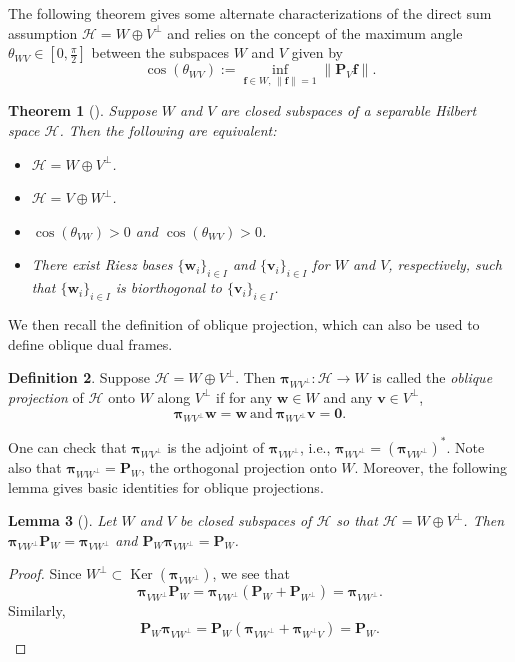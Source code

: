 \documentclass{amsart}
\numberwithin{equation}{section}
\DeclareMathOperator{\kernel}{Ker}
\newcommand{\bP}{{\mathbf P}}
\newcommand{\bpi}{{\boldsymbol{\pi}}}
\theoremstyle{plain}
\newtheorem{theorem}{Theorem}[section]
\newtheorem{lemma}[theorem]{Lemma}
\theoremstyle{remark}
\theoremstyle{definition}
\newtheorem{definition}[theorem]{Definition}
\begin{document}
The following theorem gives some alternate characterizations of the direct sum assumption $\mathcal{H} = W \oplus V^{\perp}$ and
relies on the concept of the maximum angle $\theta_{WV} \in [0, \frac{\pi}{2}]$ between the subspaces $W$ and $V$ given by
\begin{equation*}
    \cos(\theta_{WV}) := \inf_{{\mathbf{f} \in W, \,\|\mathbf{f}\|=1}} \| \bP_V \mathbf{f} \|. 
\end{equation*}
\begin{theorem}[{\cite[Theorem 2.3]{tang2000oblique}}]\label{lem:directsumangle}
Suppose $W$ and $V$ are closed subspaces of a separable Hilbert space $\mathcal{H}$. Then the following are equivalent:
\begin{itemize}
  \item[$(1)$] $\mathcal{H} = W \oplus V^{\perp}$.
    \item[$(2)$] $\mathcal{H} = V \oplus W^{\perp}$.
    \item[$(3)$] $\cos(\theta_{VW}) > 0$ and $\cos(\theta_{WV}) > 0$.
    \item[$(4)$] There exist Riesz bases $\{\mathbf{w}_i\}_{i \in I}$ and $\{\mathbf{v}_i\}_{i \in I}$ for
    $W$ and $V$, respectively, such that $\{\mathbf{w}_i\}_{i \in I}$ is biorthogonal to $\{\mathbf{v}_i\}_{i \in I}$.
\end{itemize}
\end{theorem}


We then recall the definition of oblique projection, which can also be used to define oblique dual frames.  

\begin{definition}
    Suppose $\mathcal{H} = W \oplus V^\perp$. Then $\bpi_{WV^\perp}: \mathcal{H} \rightarrow W$ is called the \emph{oblique projection} of $\mathcal{H}$ onto $W$ along $V^\perp$ if for any $\mathbf{w} \in W$ and any $\mathbf{v} \in V^\perp$, 
    $$\bpi_{WV^\perp} \mathbf{w} = \mathbf{w} \ \text{and} \ \bpi_{WV^\perp} \mathbf{v} = \mathbf{0}.$$
\end{definition}

One can check that $\bpi_{WV^\perp}$ is the adjoint of $\bpi_{VW^\perp}$, i.e., $\bpi_{WV^\perp}= (\bpi_{VW^\perp})^*$. Note also that $\bpi_{WW^\perp} = \bP_W$, the orthogonal projection onto $W$. Moreover, the following lemma gives basic identities for oblique projections.
\begin{lemma}[{\cite[Lemma 2.1]{heineken2018oblique}}]\label{lemma:oblique_proj_identity}
  Let $W$ and $V$ be closed subspaces of $\mathcal{H}$ so that $\mathcal{H} = W \oplus V^\perp$. Then $\bpi_{VW^\perp} \bP_{W} = \bpi_{VW^\perp}$ and $\bP_{W} \bpi_{VW^\perp} = \bP_{W}$. 
\end{lemma}
\begin{proof}
    Since $W^\perp \subset \kernel (\bpi_{VW^\perp})$, we see that 
    \[
        \bpi_{VW^\perp} \bP_{W} = \bpi_{VW^\perp} (\bP_{W}+\bP_{W^\perp})= \bpi_{VW^\perp}.
    \]
    Similarly, 
    \[
        \bP_{W} \bpi_{VW^\perp} =\bP_{W} (\bpi_{VW^\perp}+ \bpi_{W^\perp V}) = \bP_{W}.
    \]
\end{proof}
\end{document}
